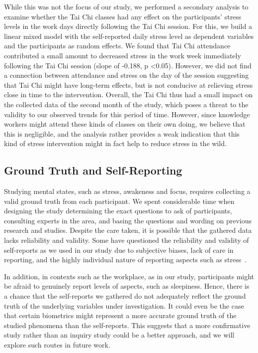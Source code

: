 While this was not the focus of our study, we performed a secondary analysis to examine whether the Tai Chi classes had any effect on the participants' stress levels in the work days directly following the Tai Chi session. For this, we build a linear mixed model with the self-reported daily stress level as dependent variables and the participants as random effects. We found that Tai Chi attendance contributed a small amount to decreased stress in the work week immediately following the Tai Chi session (slope of -0.188, p <0.05). However, we did not find a connection between attendance and stress on the day of the session suggesting that Tai Chi might have long-term effects, but is not conducive at relieving stress close in time to the intervention. Overall, the Tai Chi thus had a small impact on the collected data of the second month of the study, which poses a threat to the validity to our observed trends for this period of time. However, since knowledge workers might attend these kinds of classes on their own doing, we believe that this is negligible, and the analysis rather provides a weak indication that this kind of stress intervention might in fact help to reduce stress in the wild.

\subsection{Ground Truth and Self-Reporting}

\vspace{-4mm}
Studying mental states, such as stress, awakeness and focus,
requires collecting a valid ground truth from each participant.
We spent considerable time when designing the study
 determining the exact questions to ask of participants,
consulting experts in the area, and basing
the questions and wording on previous research and studies. 
Despite the care taken, it is possible that the 
gathered data lacks reliability and validity. Some have
questioned the
reliability and validity of self-reports as we used in our study
due to subjective biases, lack of care in reporting, and the
highly individual nature of reporting aspects such as
stress~\cite{Hernandez11,Hovsepian15}. 

In addition, in contexts such
as the workplace, as in our study,
participants  might be afraid to genuinely report levels
of aspects, such as sleepiness. Hence, there is a chance that the
self-reports we gathered  do not adequately reflect the ground
truth of the underlying variables under investigation. It could even be
the case that certain biometrics might represent a more accurate
ground truth of the studied phenomena than the self-reports. This
suggests that a more confirmative study rather than an inquiry study
could be a better approach, and we will explore such routes in future
work.

